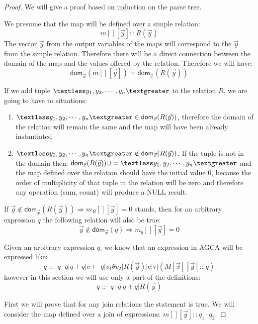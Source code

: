 \documentclass[12pt]{article}
\newcommand{\dom}{\textsf{dom}}
\begin{document}
\begin{proof}
We will give a proof based on induction on the parse tree.

We presume that the map will be defined over a simple relation: $$m[][\vec{y}]::R(\vec{y})$$ The vector $\vec{y}$ from the output variables of the maps will correspond to the $\vec{y}$ from the simple relation. Therefore there will be a direct connection between the domain of the map and the values offered by the relation. Therefore we will have: 
$$\dom{}_{\vec{x}}(m[][\vec{y}])=\dom{}_{\vec{x}}(R(\vec{y}))$$ 

If we add tuple $\textless y_1,y_2,\cdots,y_n\textgreater$ to the relation $R$, we are going to have to situations:
\begin{enumerate}
\item $\textless y_1,y_2,\cdots,y_n\textgreater\in\dom{}_{\vec{x}}(R(\vec{y}))$, therefore the domain of the relation will remain the same and the map will have been already instantiated
\item $\textless y_1,y_2,\cdots,y_n\textgreater\notin\dom{}_{\vec{x}}(R(\vec{y}))$. If the tuple is not in the domain then: $\dom{}_{\vec x}(R(\vec y))\cup=\textless y_1,y_2,\cdots,y_n\textgreater$ and the map defined over the relation should have the initial value 0, because the order of multiplicity of that tuple in the relation will be zero and therefore any operation (sum, count) will produce a NULL result.
\end{enumerate}

If $\vec{y}\notin\dom{}_{\vec{x}}(R(\vec{y}))\Rightarrow m_R[][\vec{y}]=0$ stands, then for an arbitrary expression $q$ the following relation will also be true: $$\vec{y}\notin\dom{}_{\vec{x}}(q)\Rightarrow m_q[][\vec{y}]=0$$

Given an arbitrary expression $q$, we know that an expression in AGCA will be expressed like: $$q\text{ ::- }q\cdot q | q + q|v \gets q |v_{1}\theta v_{2}|R(\vec{y})|\text{c}|\text{v}|(M[\vec{x}][\vec{y}]\text{::-}q)$$ however in this section we will use only a part of the definitions: $$q\text{ ::- }q\cdot q | q + q|R(\vec{y})$$

First we will prove that for any join relations the statement is true. We will consider the map defined over a join of expressions: $m[][\vec{y}]::q_1\cdot q_2$. 


\end{proof}
\end{document}

